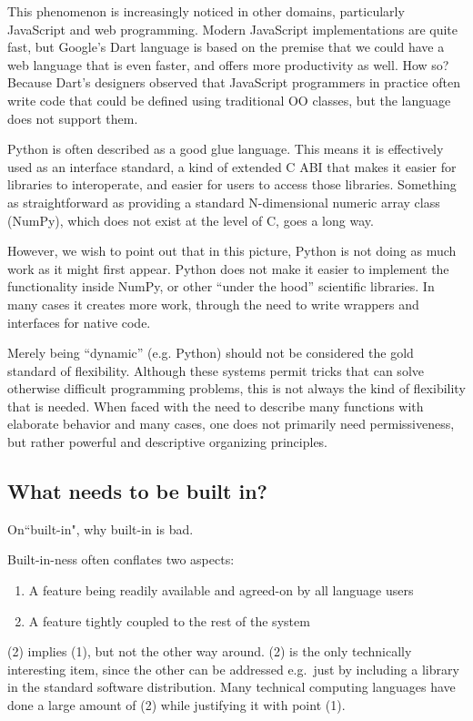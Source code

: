 {This phenomenon is increasingly noticed in other domains, particularly
JavaScript and web programming. Modern JavaScript implementations are
quite fast, but Google's Dart language is based on the premise that
we could have a web language that is even faster, and offers more
productivity as well. How so? Because Dart's designers observed that
JavaScript programmers in practice often write code that could be
defined using traditional OO classes, but the language does not
support them.

Python is often described as a good glue language. This
means it is effectively used as an interface standard, a kind of
extended C ABI that makes it easier for libraries to interoperate,
and easier for users to access those libraries. Something as straightforward
as providing a standard N-dimensional numeric array class (NumPy),
which does not exist at the level of C, goes a long way.

However, we wish to point out that in this picture, Python is not
doing as much work as it might first appear. Python does not make
it easier to implement the functionality inside NumPy, or other
``under the hood'' scientific libraries. In many cases it creates
more work, through the need to write wrappers and interfaces
for native code.

Merely being ``dynamic'' (e.g. Python) should not be considered
the gold standard of flexibility. Although these systems permit
tricks that can solve otherwise difficult programming problems,
this is not always the kind of flexibility that is needed.
When faced with the need to describe many functions with elaborate
behavior and many cases, one does not primarily need permissiveness,
but rather powerful and descriptive organizing principles.


\subsection{What needs to be built in?}

On``built-in", why built-in is bad.

Built-in-ness often conflates two aspects:

\begin{enumerate}
\item A feature being readily available and agreed-on by all language users
\item A feature tightly coupled to the rest of the system
\end{enumerate}

(2) implies (1), but not the other way around. (2) is the only technically
interesting item, since the other can be addressed e.g.\  just by including
a library in the standard software distribution. Many technical computing
languages have done a large amount of (2) while justifying it with point (1).


}
